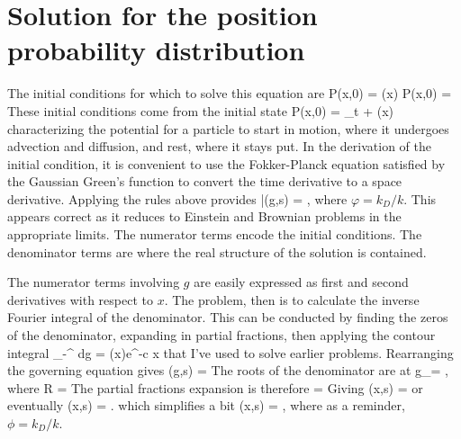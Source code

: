 {\section{Solution for the position probability distribution}
\label{sec:fluccymastersol}
The initial conditions for which to solve this equation are 
\be P(x,0) = \delta(x) \ee
\be \pt P(x,0) = \ee
These initial conditions come from the initial state
\be P(x,0) = \lim_{t }   \exp{}+ \delta(x)\ee
characterizing the potential for a particle to start in motion, where it undergoes advection and diffusion, and rest, where it stays put. In the derivation of the initial condition, it is convenient to use the Fokker-Planck equation satisfied by the Gaussian Green's function to convert the time derivative to a space derivative.
Applying the rules above provides
\be \bar{}(g,s) = , \ee
where $\varphi = k_D/k$.
This appears correct as it reduces to Einstein and Brownian problems in the appropriate limits.
The numerator terms encode the initial conditions. The denominator terms are where the real structure of the solution is contained.

The numerator terms involving $g$ are easily expressed as first and second derivatives with respect to $x$. The problem, then is to calculate the inverse Fourier integral of the denominator. This can be conducted by finding the zeros of the denominator, expanding in partial fractions, then applying the contour integral
\be \int_{-\infty}^\infty {}  dg = \theta(x)e^{-c x}\ee
that I've used to solve earlier problems. Rearranging the governing equation gives
\be {}(g,s) = \ee
The roots of the denominator are at
\be g_\pm = \Big[ 1  \pm R \Big],\ee
where
\be R = \ee
The partial fractions expansion is therefore
\be {} = \ee
Giving 
\be {}(x,s) = \ee
or eventually
\be {}(x,s) = .\ee
which simplifies a bit
\be {}(x,s) = \exp{}, \label{eq:laplace}\ee
where as a reminder, $\phi = k_D/k$.

}
